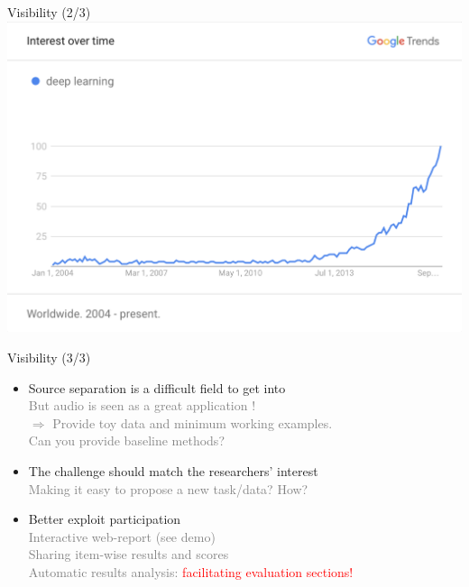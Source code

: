 \documentclass{beamer}
\begin{document}
\begin{frame}{Visibility (2/3)}
\includegraphics[width=\textwidth]{fig/deep_learning.png}
\end{frame}

\begin{frame}{Visibility (3/3)}
\begin{itemize}

\item Source separation is a difficult field to get into\\
\textcolor{gray}{But audio is seen as a great application !\\$\Rightarrow$ Provide toy data and minimum working examples.\\Can you provide baseline methods?}
\item The challenge should match the researchers' interest\\
\textcolor{gray}{Making it easy to propose a new task/data? How?}
\item Better exploit participation\\
\textcolor{gray}{Interactive web-report (see demo)\\
Sharing item-wise results and scores\\
Automatic results analysis: }\textcolor{red}{facilitating evaluation sections!}
\end{itemize}
\end{frame}
\end{document}
